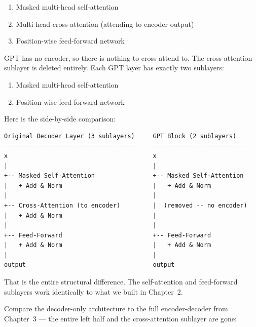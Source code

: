 \begin{enumerate}
  \item Masked multi-head self-attention
  \item Multi-head cross-attention (attending to encoder output)
  \item Position-wise feed-forward network
\end{enumerate}

GPT has no encoder, so there is nothing to cross-attend to. The cross-attention sublayer is deleted entirely. Each GPT layer has exactly two sublayers:

\begin{enumerate}
  \item Masked multi-head self-attention
  \item Position-wise feed-forward network
\end{enumerate}

Here is the side-by-side comparison:

\begin{verbatim}
Original Decoder Layer (3 sublayers)     GPT Block (2 sublayers)
-------------------------------------    -------------------------
x                                        x
|                                        |
+-- Masked Self-Attention                +-- Masked Self-Attention
|   + Add & Norm                         |   + Add & Norm
|                                        |
+-- Cross-Attention (to encoder)         |  (removed -- no encoder)
|   + Add & Norm                         |
|                                        |
+-- Feed-Forward                         +-- Feed-Forward
|   + Add & Norm                         |   + Add & Norm
|                                        |
output                                   output
\end{verbatim}

That is the entire structural difference. The self-attention and feed-forward sublayers work identically to what we built in Chapter~2.

Compare the decoder-only architecture to the full encoder-decoder from Chapter~3 --- the entire left half and the cross-attention sublayer are gone:

